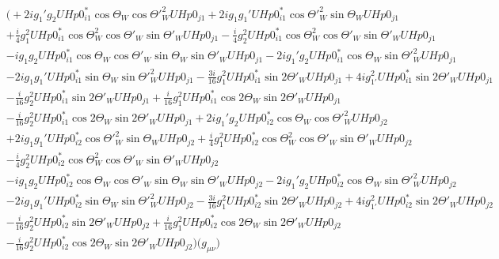 \begin{align} 
 &\Big(+2 i g_1' g_2 UHp0^*_{i 1} \cos\Theta_W  \cos{\Theta'}_{W }^{2} UHp0_{{j 1}} +2 i g_1 g_1' UHp0^*_{i 1} \cos{\Theta'}_{W }^{2} \sin\Theta_W  UHp0_{{j 1}} \nonumber \\ 
 &+\frac{i}{4} g_{1}^{2} UHp0^*_{i 1} \cos\Theta_{W }^{2} \cos{\Theta'}_W  \sin{\Theta'}_W  UHp0_{{j 1}} -\frac{i}{4} g_{2}^{2} UHp0^*_{i 1} \cos\Theta_{W }^{2} \cos{\Theta'}_W  \sin{\Theta'}_W  UHp0_{{j 1}} \nonumber \\ 
 &-i g_1 g_2 UHp0^*_{i 1} \cos\Theta_W  \cos{\Theta'}_W  \sin\Theta_W  \sin{\Theta'}_W  UHp0_{{j 1}} -2 i g_1' g_2 UHp0^*_{i 1} \cos\Theta_W  \sin{\Theta'}_{W }^{2} UHp0_{{j 1}} \nonumber \\ 
 &-2 i g_1 g_1' UHp0^*_{i 1} \sin\Theta_W  \sin{\Theta'}_{W }^{2} UHp0_{{j 1}} -\frac{3 i}{16} g_{1}^{2} UHp0^*_{i 1} \sin2 {\Theta'}_W   UHp0_{{j 1}} +4 i g_{1'}^{2} UHp0^*_{i 1} \sin2 {\Theta'}_W   UHp0_{{j 1}} \nonumber \\ 
 &-\frac{i}{16} g_{2}^{2} UHp0^*_{i 1} \sin2 {\Theta'}_W   UHp0_{{j 1}} +\frac{i}{16} g_{1}^{2} UHp0^*_{i 1} \cos2 \Theta_W   \sin2 {\Theta'}_W   UHp0_{{j 1}} \nonumber \\ 
 &-\frac{i}{16} g_{2}^{2} UHp0^*_{i 1} \cos2 \Theta_W   \sin2 {\Theta'}_W   UHp0_{{j 1}} +2 i g_1' g_2 UHp0^*_{i 2} \cos\Theta_W  \cos{\Theta'}_{W }^{2} UHp0_{{j 2}} \nonumber \\ 
 &+2 i g_1 g_1' UHp0^*_{i 2} \cos{\Theta'}_{W }^{2} \sin\Theta_W  UHp0_{{j 2}} +\frac{i}{4} g_{1}^{2} UHp0^*_{i 2} \cos\Theta_{W }^{2} \cos{\Theta'}_W  \sin{\Theta'}_W  UHp0_{{j 2}} \nonumber \\ 
 &-\frac{i}{4} g_{2}^{2} UHp0^*_{i 2} \cos\Theta_{W }^{2} \cos{\Theta'}_W  \sin{\Theta'}_W  UHp0_{{j 2}} \nonumber \\ 
 &-i g_1 g_2 UHp0^*_{i 2} \cos\Theta_W  \cos{\Theta'}_W  \sin\Theta_W  \sin{\Theta'}_W  UHp0_{{j 2}} -2 i g_1' g_2 UHp0^*_{i 2} \cos\Theta_W  \sin{\Theta'}_{W }^{2} UHp0_{{j 2}} \nonumber \\ 
 &-2 i g_1 g_1' UHp0^*_{i 2} \sin\Theta_W  \sin{\Theta'}_{W }^{2} UHp0_{{j 2}} -\frac{3 i}{16} g_{1}^{2} UHp0^*_{i 2} \sin2 {\Theta'}_W   UHp0_{{j 2}} +4 i g_{1'}^{2} UHp0^*_{i 2} \sin2 {\Theta'}_W   UHp0_{{j 2}} \nonumber \\ 
 &-\frac{i}{16} g_{2}^{2} UHp0^*_{i 2} \sin2 {\Theta'}_W   UHp0_{{j 2}} +\frac{i}{16} g_{1}^{2} UHp0^*_{i 2} \cos2 \Theta_W   \sin2 {\Theta'}_W   UHp0_{{j 2}} \nonumber \\ 
 &-\frac{i}{16} g_{2}^{2} UHp0^*_{i 2} \cos2 \Theta_W   \sin2 {\Theta'}_W   UHp0_{{j 2}} \Big)\Big(g_{\mu \nu}\Big)\end{align} 
